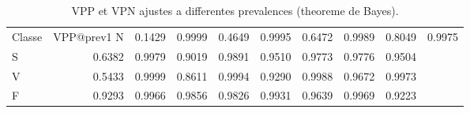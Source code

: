 \begin{table}
\caption{VPP et VPN ajustes a differentes prevalences (theoreme de Bayes).}
\label{tab:prevalence}
\begin{tabular}{lrrrrrrrr}
\toprule
Classe & VPP@prev1%
\midrule
N & 0.1429 & 0.9999 & 0.4649 & 0.9995 & 0.6472 & 0.9989 & 0.8049 & 0.9975 \\
S & 0.6382 & 0.9979 & 0.9019 & 0.9891 & 0.9510 & 0.9773 & 0.9776 & 0.9504 \\
V & 0.5433 & 0.9999 & 0.8611 & 0.9994 & 0.9290 & 0.9988 & 0.9672 & 0.9973 \\
F & 0.9293 & 0.9966 & 0.9856 & 0.9826 & 0.9931 & 0.9639 & 0.9969 & 0.9223 \\
\bottomrule
\end{tabular}
\end{table}
